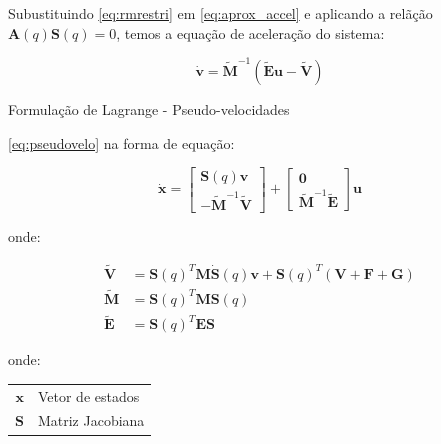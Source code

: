 Subustituindo \eqref{eq:rmrestri} em \eqref{eq:aprox_accel} e aplicando a relãção $\mathbf{A}(q)\mathbf{S}(q)=0$, temos a equação de aceleração do sistema:

\begin{equation}\label{eq:pseudovelo}
    \mathbf{\dot{v}} = \mathbf{\tilde{M}}^{-1}\left(\mathbf{\tilde{E}u - \tilde{V}} \right)
\end{equation}


Formulação de Lagrange - Pseudo-velocidades

\eqref{eq:pseudovelo} na forma de equação:

\begin{equation*}
    \mathbf{\dot{x}} =
    \begin{bmatrix}
        \mathbf{S}(q)\mathbf{v} \\
        \mathbf{-\tilde{M}}^{-1}\mathbf{\tilde{V}}
    \end{bmatrix}
    +
    \begin{bmatrix}
        \mathbf{0} \\
        \mathbf{\tilde{M}}^{-1}\mathbf{\tilde{E}}
    \end{bmatrix} \mathbf{u}
\end{equation*}

onde:

\begin{equation*}
    \begin{split}
        \mathbf{\tilde{V}} & =
        \mathbf{S}(q)^T\mathbf{M}\mathbf{\dot{S}}(q)\mathbf{v} + \mathbf{S}(q)^T (\mathbf{V + F + G})\\
        \mathbf{\tilde{M}} & = \mathbf{S}(q)^T\mathbf{M}\mathbf{S}(q)\\
        \mathbf{\tilde{E}} & = \mathbf{S}(q)^T\mathbf{E}\mathbf{S}
    \end{split}
\end{equation*}

onde:
\begin{tabular}{ r | l }
    $\mathbf{x}$ & Vetor de estados \\
    $\mathbf{S}$ & Matriz Jacobiana \\
\end{tabular}







